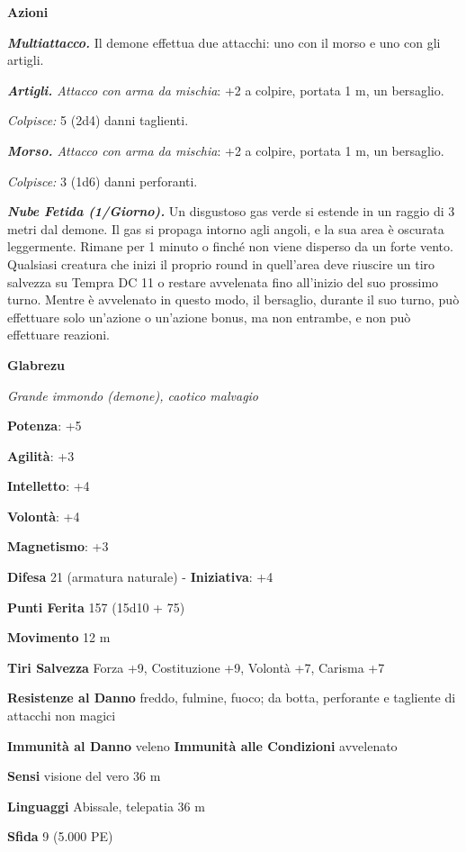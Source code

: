 \begin{multicols}{2}
\smallskip\textbf{Azioni}

\emph{\textbf{Multiattacco.}} Il demone effettua due attacchi: uno con
il morso e uno con gli artigli.

\emph{\textbf{Artigli.} Attacco con arma da mischia}: +2 a colpire,
portata 1 m, un bersaglio.

\emph{Colpisce:} 5 (2d4) danni taglienti.

\emph{\textbf{Morso.} Attacco con arma da mischia}: +2 a colpire,
portata 1 m, un bersaglio.

\emph{Colpisce:} 3 (1d6) danni perforanti.

\emph{\textbf{Nube Fetida (1/Giorno).}} Un disgustoso gas verde si
estende in un raggio di 3 metri dal demone. Il gas si propaga intorno
agli angoli, e la sua area è oscurata leggermente. Rimane per 1 minuto o
finché non viene disperso da un forte vento. Qualsiasi creatura che
inizi il proprio round in quell'area deve riuscire un tiro salvezza su Tempra DC 11 o restare avvelenata fino all'inizio del suo prossimo
turno. Mentre è avvelenato in questo modo, il bersaglio, durante il suo
turno, può effettuare solo un'azione o un'azione bonus, ma non entrambe,
e non può effettuare reazioni.



\textbf{Glabrezu}

\emph{Grande immondo (demone), caotico malvagio}

\textbf{Potenza}: +5

\textbf{Agilità}: +3

\textbf{Intelletto}: +4

\textbf{Volontà}: +4

\textbf{Magnetismo}: +3

\textbf{Difesa} 21 (armatura naturale) - \textbf{Iniziativa}: +4

\textbf{Punti Ferita} 157 (15d10 + 75)

\textbf{Movimento} 12 m

\textbf{Tiri Salvezza} Forza +9, Costituzione +9, Volontà +7, Carisma
+7

\textbf{Resistenze al Danno} freddo, fulmine, fuoco; da botta,
perforante e tagliente di attacchi non magici

\textbf{Immunità al Danno} veleno \textbf{Immunità alle Condizioni}
avvelenato

\textbf{Sensi} visione del vero 36 m

\textbf{Linguaggi} Abissale, telepatia 36 m 

\textbf{Sfida} 9 (5.000 PE)\smallskip


\end{multicols}
